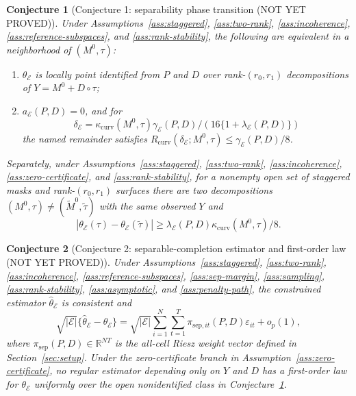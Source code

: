 \documentclass[11pt]{article}
\newcommand{\R}{\mathbb{R}}
\theoremstyle{definition}
\theoremstyle{plain}
\newtheorem{conjecture}{Conjecture}
\theoremstyle{remark}
\begin{document}
\begin{conjecture}[Conjecture 1: separability phase transition (NOT YET PROVED)]\label{conj:sep-frontier}
Under Assumptions~\ref{ass:staggered}, \ref{ass:two-rank}, \ref{ass:incoherence}, \ref{ass:reference-subspaces}, and \ref{ass:rank-stability}, the following are equivalent in a neighborhood of \((M^0,\tau)\):
\begin{enumerate}[label=(\roman*)]
\item \(\theta_{\mathcal E}\) is locally point identified from \(P\) and \(D\) over rank-\((r_0,r_1)\) decompositions of \(Y=M^0+D\circ\tau\);
\item \(a_{\mathcal E}(P,D)=0\), and for
\[
\delta_{\mathcal E}=\kappa_{\mathrm{curv}}(M^0,\tau)\gamma_{\mathcal E}(P,D)/(16\{1+\lambda_{\mathcal E}(P,D)\})
\]
the named remainder satisfies \(R_{\mathrm{curv}}(\delta_{\mathcal E};M^0,\tau)\le \gamma_{\mathcal E}(P,D)/8\).
\end{enumerate}
Separately, under Assumptions~\ref{ass:staggered}, \ref{ass:two-rank}, \ref{ass:incoherence}, \ref{ass:zero-certificate}, and \ref{ass:rank-stability}, for a nonempty open set of staggered masks and rank-\((r_0,r_1)\) surfaces there are two decompositions \((M^0,\tau)\ne(\widetilde M^0,\widetilde\tau)\) with the same observed \(Y\) and
\[
|\theta_{\mathcal E}(\tau)-\theta_{\mathcal E}(\widetilde\tau)|
\ge
\lambda_{\mathcal E}(P,D)\kappa_{\mathrm{curv}}(M^0,\tau)/8.
\]
\end{conjecture}

\begin{conjecture}[Conjecture 2: separable-completion estimator and first-order law (NOT YET PROVED)]\label{conj:estimator}
Under Assumptions~\ref{ass:staggered}, \ref{ass:two-rank}, \ref{ass:incoherence}, \ref{ass:reference-subspaces}, \ref{ass:sep-margin}, \ref{ass:sampling}, \ref{ass:rank-stability}, \ref{ass:asymptotic}, and \ref{ass:penalty-path}, the constrained estimator \(\widehat\theta_{\mathcal E}\) is consistent and
\[
\sqrt{|\mathcal E|}\{\widehat\theta_{\mathcal E}-\theta_{\mathcal E}\}
=\sqrt{|\mathcal E|}\sum_{i=1}^N\sum_{t=1}^T\pi_{\mathrm{sep},it}(P,D)\varepsilon_{it}+o_p(1),
\]
where \(\pi_{\mathrm{sep}}(P,D)\in\R^{NT}\) is the all-cell Riesz weight vector defined in Section~\ref{sec:setup}.  Under the zero-certificate branch in Assumption~\ref{ass:zero-certificate}, no regular estimator depending only on \(Y\) and \(D\) has a first-order law for \(\theta_{\mathcal E}\) uniformly over the open nonidentified class in Conjecture~\ref{conj:sep-frontier}.
\end{conjecture}
\end{document}
